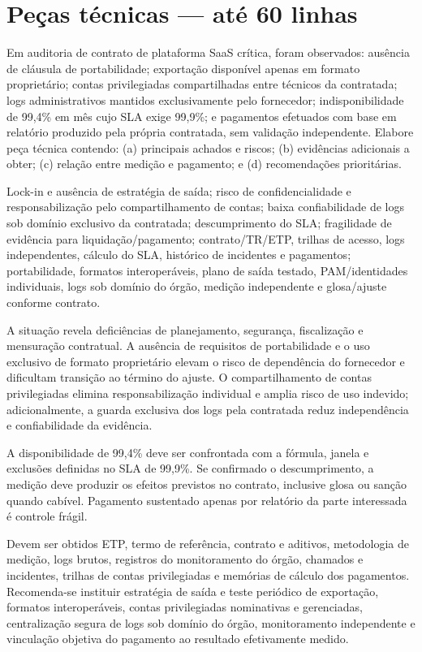 \section{Peças técnicas — até 60 linhas}

\begin{discursiva}
Em auditoria de contrato de plataforma SaaS crítica, foram observados: ausência de cláusula de portabilidade; exportação disponível apenas em formato proprietário; contas privilegiadas compartilhadas entre técnicos da contratada; logs administrativos mantidos exclusivamente pelo fornecedor; indisponibilidade de 99,4\% em mês cujo SLA exige 99,9\%; e pagamentos efetuados com base em relatório produzido pela própria contratada, sem validação independente. Elabore peça técnica contendo: (a) principais achados e riscos; (b) evidências adicionais a obter; (c) relação entre medição e pagamento; e (d) recomendações prioritárias.
\end{discursiva}

\begin{resumo}
Lock-in e ausência de estratégia de saída; risco de confidencialidade e responsabilização pelo compartilhamento de contas; baixa confiabilidade de logs sob domínio exclusivo da contratada; descumprimento do SLA; fragilidade de evidência para liquidação/pagamento; contrato/TR/ETP, trilhas de acesso, logs independentes, cálculo do SLA, histórico de incidentes e pagamentos; portabilidade, formatos interoperáveis, plano de saída testado, PAM/identidades individuais, logs sob domínio do órgão, medição independente e glosa/ajuste conforme contrato.
\end{resumo}

\begin{teoria}
A situação revela deficiências de planejamento, segurança, fiscalização e mensuração contratual. A ausência de requisitos de portabilidade e o uso exclusivo de formato proprietário elevam o risco de dependência do fornecedor e dificultam transição ao término do ajuste. O compartilhamento de contas privilegiadas elimina responsabilização individual e amplia risco de uso indevido; adicionalmente, a guarda exclusiva dos logs pela contratada reduz independência e confiabilidade da evidência.

A disponibilidade de 99,4\% deve ser confrontada com a fórmula, janela e exclusões definidas no SLA de 99,9\%. Se confirmado o descumprimento, a medição deve produzir os efeitos previstos no contrato, inclusive glosa ou sanção quando cabível. Pagamento sustentado apenas por relatório da parte interessada é controle frágil.

Devem ser obtidos ETP, termo de referência, contrato e aditivos, metodologia de medição, logs brutos, registros do monitoramento do órgão, chamados e incidentes, trilhas de contas privilegiadas e memórias de cálculo dos pagamentos. Recomenda-se instituir estratégia de saída e teste periódico de exportação, formatos interoperáveis, contas privilegiadas nominativas e gerenciadas, centralização segura de logs sob domínio do órgão, monitoramento independente e vinculação objetiva do pagamento ao resultado efetivamente medido.
\end{teoria}

